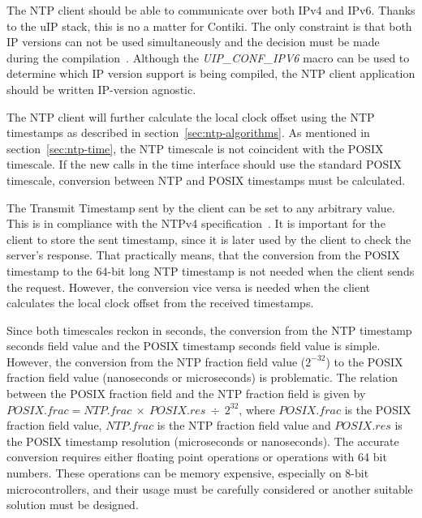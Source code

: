 The NTP client should be able to communicate over both IPv4 and IPv6.
Thanks to the uIP stack, this is no a matter for Contiki.
The only constraint is that both IP versions can not be used simultaneously
and the decision must be made during the compilation~\cite{contiki-docs}.
Although the {\it{UIP\_CONF\_IPV6}} macro can be used to determine which IP version
support is being compiled, the NTP client application should be written IP-version agnostic.

The NTP client will further calculate the local clock offset using the NTP timestamps
as described in section~\ref{sec:ntp-algorithms}.
As mentioned in section~\ref{sec:ntp-time}, the NTP timescale is not
coincident with the POSIX timescale.
If the new calls in the time interface should use the standard POSIX timescale,
conversion between NTP and POSIX timestamps must be calculated.

The Transmit Timestamp sent by the client can be set to any arbitrary value.
This is in compliance with the NTPv4 specification~\cite{rfc5905}.
It is important for the client to store the sent timestamp,
since it is later used by the client to check the server's response.
That practically means, that the conversion from the POSIX timestamp to the 64-bit long NTP timestamp
is not needed when the client sends the request.
However, the conversion vice versa is needed when the client calculates
the local clock offset from the received timestamps.

Since both timescales reckon in seconds, the conversion from
the NTP timestamp seconds field value and the POSIX timestamp seconds field value is simple.
However, the conversion from the NTP fraction field value ($2^{-32}$)
to the POSIX fraction field value (nanoseconds or microseconds) is problematic.
The relation between the POSIX fraction field and the NTP fraction field
is given by $POSIX.frac = NTP.frac~\times~POSIX.res~\div~2^{32}$,
where $POSIX.frac$ is the POSIX fraction field value,
$NTP.frac$ is the NTP fraction field value and
$POSIX.res$ is the POSIX timestamp resolution (microseconds or nanoseconds).
The accurate conversion requires either floating point operations or operations with 64 bit numbers.
These operations can be memory expensive, especially on 8-bit microcontrollers,
and their usage must be carefully considered or another suitable solution must be designed.
